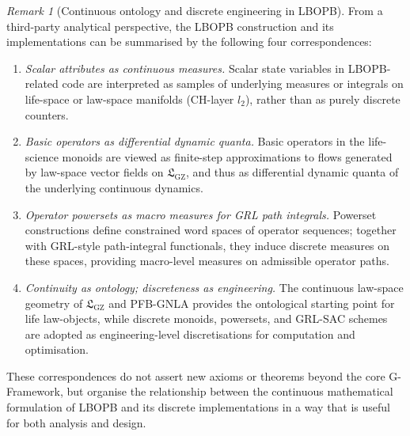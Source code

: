 \documentclass[11pt]{book}
\theoremstyle{plain}
\theoremstyle{definition}
\theoremstyle{remark}
\newtheorem{remark}[theorem]{Remark}
\newcommand{\GZLS}{\ensuremath{\mathfrak{L}_{\mathrm{GZ}}}}       \newcommand{\GZLT}{\ensuremath{M_{!w}}}                           \newcommand{\GZLOC}{\ensuremath{A_M}}                             \newcommand{\GZLCurv}{\ensuremath{\mathcal{F}_{\mathrm{law}}}}
\begin{document}
\begin{remark}[Continuous ontology and discrete engineering in LBOPB]
From a third-party analytical perspective, the LBOPB construction and
its implementations can be summarised by the following four
correspondences:
\begin{enumerate}
  \item \emph{Scalar attributes as continuous measures.}
        Scalar state variables in LBOPB-related code are interpreted
        as samples of underlying measures or integrals on life-space
        or law-space manifolds (CH-layer $l_2$), rather than as purely
        discrete counters.
  \item \emph{Basic operators as differential dynamic quanta.}
        Basic operators in the life-science monoids are viewed as
        finite-step approximations to flows generated by law-space
        vector fields on $\GZLS$, and thus as differential dynamic
        quanta of the underlying continuous dynamics.
  \item \emph{Operator powersets as macro measures for GRL path
        integrals.}
        Powerset constructions define constrained word spaces of
        operator sequences; together with GRL-style path-integral
        functionals, they induce discrete measures on these spaces,
        providing macro-level measures on admissible operator paths.
  \item \emph{Continuity as ontology; discreteness as engineering.}
        The continuous law-space geometry of $\GZLS$ and PFB-GNLA
        provides the ontological starting point for life law-objects,
        while discrete monoids, powersets, and GRL-SAC schemes are
        adopted as engineering-level discretisations for computation
        and optimisation.
\end{enumerate}
These correspondences do not assert new axioms or theorems beyond the
core G-Framework, but organise the relationship between the continuous
mathematical formulation of LBOPB and its discrete implementations in
a way that is useful for both analysis and design.
\end{remark}
\end{document}
